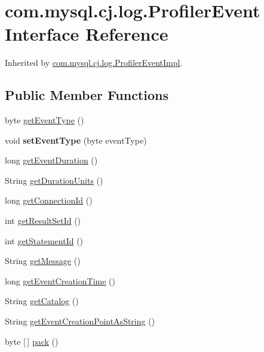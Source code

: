 \hypertarget{interfacecom_1_1mysql_1_1cj_1_1log_1_1_profiler_event}{}\section{com.\+mysql.\+cj.\+log.\+Profiler\+Event Interface Reference}
\label{interfacecom_1_1mysql_1_1cj_1_1log_1_1_profiler_event}


Inherited by \mbox{\hyperlink{classcom_1_1mysql_1_1cj_1_1log_1_1_profiler_event_impl}{com.\+mysql.\+cj.\+log.\+Profiler\+Event\+Impl}}.

\subsection*{Public Member Functions}
\begin{DoxyCompactItemize}
\item 
byte \mbox{\hyperlink{interfacecom_1_1mysql_1_1cj_1_1log_1_1_profiler_event_a5bc617e47a2d49ad356c17bd45f5be0d}{get\+Event\+Type}} ()
\item 
\mbox{\label{interfacecom_1_1mysql_1_1cj_1_1log_1_1_profiler_event_a9d335a56c66afa440fce845f973e759e}} 
void {\bfseries set\+Event\+Type} (byte event\+Type)
\item 
long \mbox{\hyperlink{interfacecom_1_1mysql_1_1cj_1_1log_1_1_profiler_event_a82728ebce7920e4a0096f8135ec8336b}{get\+Event\+Duration}} ()
\item 
String \mbox{\hyperlink{interfacecom_1_1mysql_1_1cj_1_1log_1_1_profiler_event_aabb8272339aac8d5fd4985da51c93cd9}{get\+Duration\+Units}} ()
\item 
long \mbox{\hyperlink{interfacecom_1_1mysql_1_1cj_1_1log_1_1_profiler_event_ac1990bb68ea1968dc7c432523e822fab}{get\+Connection\+Id}} ()
\item 
int \mbox{\hyperlink{interfacecom_1_1mysql_1_1cj_1_1log_1_1_profiler_event_abe44cf020bbacb1e6c854de7cc8625c9}{get\+Result\+Set\+Id}} ()
\item 
int \mbox{\hyperlink{interfacecom_1_1mysql_1_1cj_1_1log_1_1_profiler_event_abe6c8708b242e58efb697d63c0b78a6d}{get\+Statement\+Id}} ()
\item 
String \mbox{\hyperlink{interfacecom_1_1mysql_1_1cj_1_1log_1_1_profiler_event_aebc12f64998b49e30c39a61e08f34a2c}{get\+Message}} ()
\item 
long \mbox{\hyperlink{interfacecom_1_1mysql_1_1cj_1_1log_1_1_profiler_event_aaadc6536f2576ccdc026fe5ad1d01ff0}{get\+Event\+Creation\+Time}} ()
\item 
String \mbox{\hyperlink{interfacecom_1_1mysql_1_1cj_1_1log_1_1_profiler_event_a234f6be623335bd2510e74220d71c526}{get\+Catalog}} ()
\item 
String \mbox{\hyperlink{interfacecom_1_1mysql_1_1cj_1_1log_1_1_profiler_event_a839ab93561623274644822815bbaf71f}{get\+Event\+Creation\+Point\+As\+String}} ()
\item 
byte \mbox{[}$\,$\mbox{]} \mbox{\hyperlink{interfacecom_1_1mysql_1_1cj_1_1log_1_1_profiler_event_ad360df515f55034065a78397e2db5269}{pack}} ()
\end{DoxyCompactItemize}
